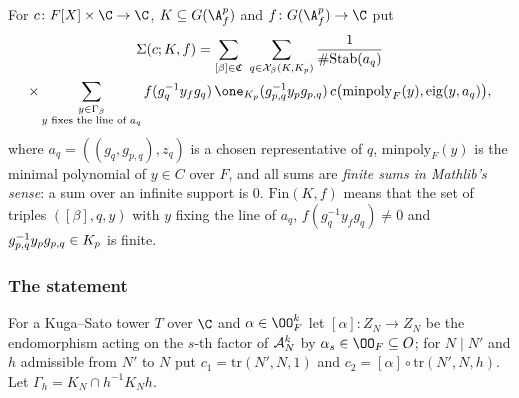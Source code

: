 \begin{definition}\label{pf:ks2:def:orbital}
For $c\colon F[X]\times\C\to\C$, $K\subseteq\kstwoG$ and $f\colon\kstwoG\to\C$ put
\begin{multline}\label{pf:ks2:eq:cxtotal}
\Sigma(c;K,f)=\sum_{[\beta]\in\mathfrak{C}}\ \sum_{q\in\mathcal{X}_\beta(K,\kstwoKp)}
\frac1{\#\mathrm{Stab}(a_q)}\\
\times\sum_{\substack{y\in\Gamma_\beta\\ y\text{ fixes the line of }a_q}}
f(g_q^{-1}y_fg_q)\,\one_{\kstwoKp}(g_{p,q}^{-1}y_pg_{p,q})\,c\bigl(\mathrm{minpoly}_F(y),\mathrm{eig}(y,a_q)\bigr),
\end{multline}
where $a_q=((g_q,g_{p,q}),z_q)$ is a chosen representative of $q$, $\mathrm{minpoly}_F(y)$ is the
minimal polynomial of $y\in C$ over $F$, and all sums are \emph{finite sums in Mathlib's sense}:
a sum over an infinite support is $0$. $\mathrm{Fin}(K,f)$ means that the set of triples $([\beta],q,y)$
with $y$ fixing the line of $a_q$, $f(g_q^{-1}y_fg_q)\ne0$ and $g_{p,q}^{-1}y_pg_{p,q}\in K_{p}$ is
finite.
\end{definition}

\subsubsection{The statement}

For a Kuga--Sato tower $T$ over $\C$ and $\alpha\in\kstwoOF^k$ let
$[\alpha]\colon Z_N\to Z_N$ be the endomorphism acting on the $s$-th factor of $\mathcal{A}_N^k$ by
$\alpha_s\in\kstwoOF\subseteq O$; for $N\mid N'$
and $h$ admissible from $N'$ to $N$ put $c_1=\mathrm{tr}(N',N,1)$ and
$c_2=[\alpha]\circ\mathrm{tr}(N',N,h)$.
Let $\Gamma_h=K_N\cap h^{-1}K_Nh$.

